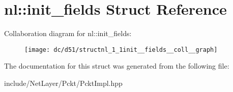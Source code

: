 \hypertarget{structnl_1_1init__fields}{}\section{nl\+:\+:init\+\_\+fields Struct Reference}
\label{structnl_1_1init__fields}


Collaboration diagram for nl\+:\+:init\+\_\+fields\+:\nopagebreak
\begin{figure}[H]
\begin{center}
\leavevmode
\texttt{[image: dc/d51/structnl\_1\_1init\_\_fields\_\_coll\_\_graph]}
\end{center}
\end{figure}


The documentation for this struct was generated from the following file\+:\begin{DoxyCompactItemize}
\item 
include/\+Net\+Layer/\+Pckt/Pckt\+Impl.\+hpp\end{DoxyCompactItemize}
